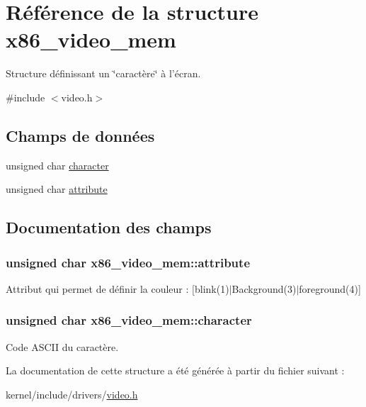 \hypertarget{structx86__video__mem}{\section{Référence de la structure x86\+\_\+video\+\_\+mem}
\label{structx86__video__mem}
}


Structure définissant un \char`\"{}caractère\char`\"{} à l'écran.  




{\ttfamily \#include $<$video.\+h$>$}

\subsection*{Champs de données}
\begin{DoxyCompactItemize}
\item 
unsigned char \hyperlink{structx86__video__mem_a806c83cac2d0536c833f810347f5539a}{character}
\item 
unsigned char \hyperlink{structx86__video__mem_ab513d18ce9ef33e2d22e426973fd7417}{attribute}
\end{DoxyCompactItemize}


\subsection{Documentation des champs}
\hypertarget{structx86__video__mem_ab513d18ce9ef33e2d22e426973fd7417}{
\subsubsection[{attribute}]{\setlength{\rightskip}{0pt plus 5cm}unsigned char x86\+\_\+video\+\_\+mem\+::attribute}}\label{structx86__video__mem_ab513d18ce9ef33e2d22e426973fd7417}
Attribut qui permet de définir la couleur \+: \mbox{[}blink(1)$\vert$\+Background(3)$\vert$foreground(4)\mbox{]} \hypertarget{structx86__video__mem_a806c83cac2d0536c833f810347f5539a}{
\subsubsection[{character}]{\setlength{\rightskip}{0pt plus 5cm}unsigned char x86\+\_\+video\+\_\+mem\+::character}}\label{structx86__video__mem_a806c83cac2d0536c833f810347f5539a}
Code A\+S\+C\+I\+I du caractère. 

La documentation de cette structure a été générée à partir du fichier suivant \+:\begin{DoxyCompactItemize}
\item 
kernel/include/drivers/\hyperlink{video_8h}{video.\+h}\end{DoxyCompactItemize}

